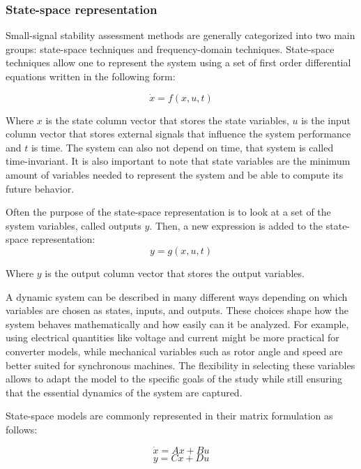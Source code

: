 \subsubsection{State-space representation}

Small-signal stability assessment methods are generally categorized into two main groups: state-space techniques
and frequency-domain techniques. State-space techniques allow one to represent the system using a set of first order
differential equations written in the following form:

\begin{equation}
    \dot{x} = f(x,u,t)
\end{equation}

Where $x$ is the state column vector that stores the state variables, $u$ is the input column vector that stores external
signals that influence the system performance and $t$ is time. The system can also not depend on time, that system is called 
time-invariant. It is also important to note that state variables are the minimum amount of variables needed to represent the
system and be able to compute its future behavior.

Often the purpose of the state-space representation is to look at a set of the system variables, called outputs $y$. Then, a new 
expression is added to the state-space representation:
\begin{equation}
    y = g(x,u,t)
\end{equation}

Where $y$ is the output column vector that stores the output variables.

A dynamic system can be described in many different ways depending on which variables are chosen as states, inputs, 
and outputs. These choices shape how the system behaves mathematically and how easily can it be analyzed. For example, 
using electrical quantities like voltage and current might be more practical for converter models, while mechanical variables 
such as rotor angle and speed are better suited for synchronous machines. The flexibility in selecting these variables allows
to adapt the model to the specific goals of the study while still ensuring that the essential dynamics of the system are captured. 

State-space models are commonly represented in their matrix formulation as follows:

\begin{equation}
\dot{x} = Ax + Bu
\end{equation}
\begin{equation}
y = Cx + Du
\end{equation}

